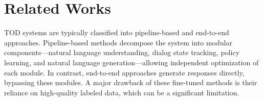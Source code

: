 
\section{Related Works} %

TOD systems are typically classified into pipeline-based and end-to-end approaches. Pipeline-based methods \cite{WILLIAMS2007393, lee-2013-structured, LEE2009466, peng-etal-2020-shot, chen-etal-2019-semantically} decompose the system into modular components—natural language understanding, dialog state tracking, policy learning, and natural language generation—allowing independent optimization of each module. In contrast, end-to-end approaches \cite{hosseini2020simple, madotto-etal-2018-mem2seq, su-etal-2022-multi, mosharrof2023zero, SiddiqueTOD, lei-etal-2018-sequicity, lin-etal-2020-mintl, imrattanatrai-fukuda-2023-end} generate responses directly, bypassing these modules. A major drawback of these fine-tuned methods is their reliance on high-quality labeled data, which can be a significant limitation.

 



